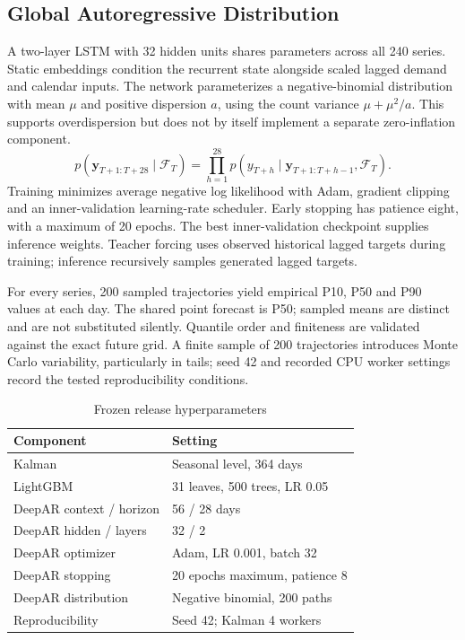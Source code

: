 \documentclass[conference]{IEEEtran}
\begin{document}
\subsection{Global Autoregressive Distribution}
A two-layer LSTM with 32 hidden units shares parameters across all 240 series. Static embeddings condition the recurrent state alongside scaled lagged demand and calendar inputs. The network parameterizes a negative-binomial distribution with mean $\mu$ and positive dispersion $a$, using the count variance $\mu+\mu^2/a$. This supports overdispersion but does not by itself implement a separate zero-inflation component.
\begin{equation}
p(\mathbf y_{T+1:T+28}\mid\mathcal F_T)=\prod_{h=1}^{28}p(y_{T+h}\mid\mathbf y_{T+1:T+h-1},\mathcal F_T).
\end{equation}
Training minimizes average negative log likelihood with Adam, gradient clipping and an inner-validation learning-rate scheduler. Early stopping has patience eight, with a maximum of 20 epochs. The best inner-validation checkpoint supplies inference weights. Teacher forcing uses observed historical lagged targets during training; inference recursively samples generated lagged targets.

For every series, 200 sampled trajectories yield empirical P10, P50 and P90 values at each day. The shared point forecast is P50; sampled means are distinct and are not substituted silently. Quantile order and finiteness are validated against the exact future grid. A finite sample of 200 trajectories introduces Monte Carlo variability, particularly in tails; seed 42 and recorded CPU worker settings record the tested reproducibility conditions.

\begin{table}[t]\caption{Frozen release hyperparameters}\label{tab:hyper}\centering\footnotesize\begin{tabular}{ll}\toprule
Component & Setting\\\midrule
Kalman & Seasonal level, 364 days\\
LightGBM & 31 leaves, 500 trees, LR 0.05\\
DeepAR context / horizon & 56 / 28 days\\
DeepAR hidden / layers & 32 / 2\\
DeepAR optimizer & Adam, LR 0.001, batch 32\\
DeepAR stopping & 20 epochs maximum, patience 8\\
DeepAR distribution & Negative binomial, 200 paths\\
Reproducibility & Seed 42; Kalman 4 workers\\\bottomrule\end{tabular}\end{table}
\end{document}
